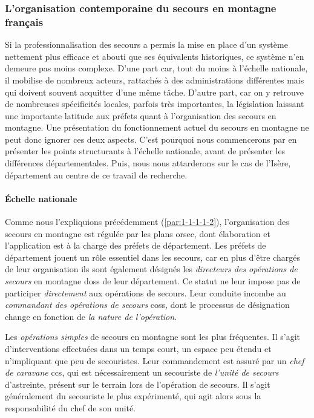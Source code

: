 \subsubsection{L'organisation contemporaine du secours en montagne français}
\label{subsubsec:1-1-1-2}

Si la professionnalisation des secours a permis la mise en place d'un
système nettement plus efficace et abouti que ses équivalents
historiques, ce système n'en demeure pas moins complexe. D'une part
car, tout du moins à l'échelle nationale, il mobilise de nombreux
acteurs, rattachés à des administrations différentes mais qui doivent
souvent acquitter d'une même tâche. D'autre part, car on y retrouve de
nombreuses spécificités locales, parfois très importantes, la
législation laissant une importante latitude aux préfets quant à
l'organisation des secours en montagne. Une présentation du
fonctionnement actuel du secours en montagne ne peut donc ignorer ces
deux aspects. C'est pourquoi nous commencerons par en présenter les
points structurants à l'échelle nationale, avant de présenter les
différences départementales. Puis, nous nous attarderons sur le cas de
l'Isère, département au centre de ce travail de recherche.

\paragraph{Échelle nationale}

Comme nous l'expliquions précédemment (\ref{par:1-1-1-1-2}),
l'organisation des secours en montagne est régulée par les plans
\ac{orsec}, dont élaboration et l'application est à la charge des
préfets de département. Les préfets de département jouent un rôle
essentiel dans les secours, car en plus d'être chargés de leur
organisation ils sont également désignés les \emph{directeurs des
  opérations de secours} en montagne \acp{dos} de leur département. Ce
statut ne leur impose pas de participer \emph{directement} aux
opérations de secours. Leur conduite incombe au \emph{commandant des
  opérations de secours} \acp{cos}, dont le processus de désignation
change en fonction de \emph{la nature de l'opération.}

Les \emph{opérations simples} de secours en montagne sont les plus
fréquentes. Il s'agit d'interventions effectuées dans un temps court,
un espace peu étendu et n'impliquant que peu de secouristes. Leur
commandement est assuré par un \emph{chef de caravane} \acp{cc}, qui
est nécessairement un secouriste de \emph{l'unité de secours}
d'astreinte, présent sur le terrain lors de l'opération de secours. Il
s'agit généralement du secouriste le plus expérimenté, qui agit alors
sous la responsabilité du chef de son unité.

